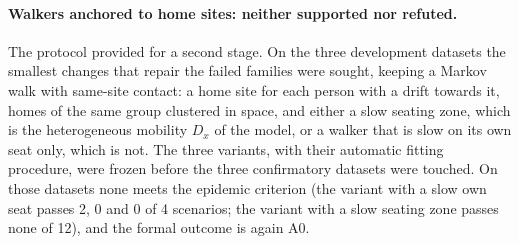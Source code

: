 \paragraph{Walkers anchored to home sites: neither supported nor refuted.}
The protocol provided for a second stage. On the three development datasets the smallest changes that repair
the failed families were sought, keeping a Markov walk with same-site contact: a home site for each person
with a drift towards it, homes of the same group clustered in space, and either a slow seating zone, which is
the heterogeneous mobility $D_x$ of the model, or a walker that is slow on its own seat only, which is not.
The three variants, with their automatic fitting procedure, were frozen before the three confirmatory datasets
were touched. On those datasets none meets the epidemic criterion (the variant with a slow own seat passes
2, 0 and 0 of 4 scenarios; the variant with a slow seating zone passes none of 12), and the formal outcome is
again A0.

